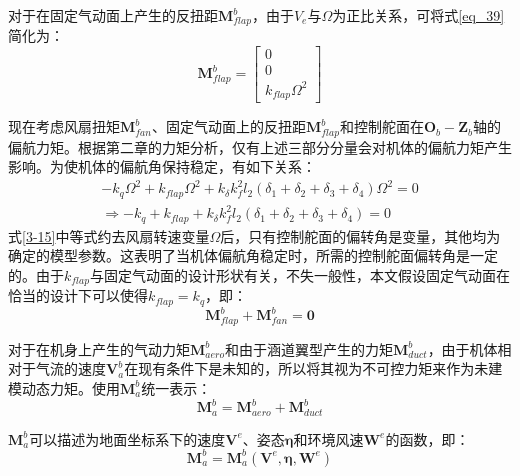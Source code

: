 对于在固定气动面上产生的反扭距$\boldsymbol{M}_{flap}^b$，由于$V_{e}$与$\Omega$为正比关系，可将式\ref{eq_39}简化为：
\begin{equation}
    \boldsymbol{M}_{flap}^b=
    \begin{bmatrix}
    0 \\0 \\k_{flap}\Omega^2
    \end{bmatrix}
    \label{3-15}
\end{equation}

现在考虑风扇扭矩$\boldsymbol{M}_{fan}^b$、固定气动面上的反扭距$\boldsymbol{M}_{flap}^b$和控制舵面在$\boldsymbol{O}_b-\boldsymbol{Z}_b$轴的偏航力矩。根据第二章的力矩分析，仅有上述三部分分量会对机体的偏航力矩产生影响。为使机体的偏航角保持稳定，有如下关系：
\begin{equation}
    \begin{gathered}
    -k_q\Omega^2+k_{flap}\Omega^2+k_{\delta}k_f^2 l_2(\delta_1 + \delta_2 + \delta_3 + \delta_4)\Omega^2=0
     \\
     \Rightarrow
    -k_q+k_{flap}+k_{\delta}k_f^2 l_2(\delta_1 + \delta_2 + \delta_3 + \delta_4)=0
    \end{gathered}
    \label{3-16}
\end{equation}
式\ref{3-15}中等式约去风扇转速变量$\Omega$后，只有控制舵面的偏转角是变量，其他均为确定的模型参数。这表明了当机体偏航角稳定时，所需的控制舵面偏转角是一定的。由于$k_{flap}$与固定气动面的设计形状有关，不失一般性，本文假设固定气动面在恰当的设计下可以使得$k_{flap}=k_{q}$，即：
\begin{equation}
    \boldsymbol{M}_{flap}^b + \boldsymbol{M}_{fan}^b = \boldsymbol{0}
\label{3-17}
\end{equation}

对于在机身上产生的气动力矩$\boldsymbol{M}_{aero}^b$和由于涵道翼型产生的力矩$\boldsymbol{M}_{duct}^b$，由于机体相对于气流的速度$\boldsymbol{V}_a^b$在现有条件下是未知的，所以将其视为不可控力矩来作为未建模动态力矩。使用$\boldsymbol{M}_{a}^b$统一表示：
\begin{equation}
    \boldsymbol{M}_{a}^b=\boldsymbol{M}_{aero}^b+\boldsymbol{M}_{duct}^b
    \label{3-18}
\end{equation}

$\boldsymbol{M}_{a}^b$可以描述为地面坐标系下的速度$\boldsymbol{V}^e$、姿态$\boldsymbol{\eta}$和环境风速$\boldsymbol{W}^e$的函数，即：
\begin{equation}
    \boldsymbol{M}_{a}^b=\boldsymbol{M}_{a}^b(\boldsymbol{V}^e,\boldsymbol{\eta},\boldsymbol{W}^e)
    \label{3-19}
\end{equation}

